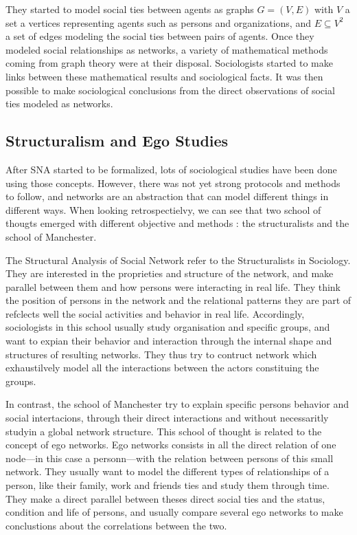 They started to model social ties between agents as graphs $G = (V, E)$ with $V$ a set a vertices representing agents such as persons and organizations, and $E \subseteq V^2$ a set of edges modeling the social ties between pairs of agents.
Once they modeled social relationships as networks, a variety of mathematical methods coming from graph theory were at their disposal. Sociologists started to make links between these mathematical results and sociological facts. It was then possible to make sociological conclusions from the direct observations of social ties modeled as networks.



\subsection{Structuralism and Ego Studies}

After SNA started to be formalized, lots of sociological studies have been done using those concepts. However, there was not yet strong protocols and methods to follow, and networks are an abstraction that can model different things in different ways. When looking retrospectielvy, we can see that two school of thougts emerged with different objective and methods : the structuralists and the school of Manchester.

The Structural Analysis of Social Network refer to the Structuralists in Sociology. They are interested in the proprieties and structure of the network, and make parallel between them and how persons were interacting in real life. They think the position of persons in the network and the relational patterns they are part of refclects well the  social activities and behavior in real life. Accordingly, sociologists in this school usually study organisation and specific groups, and want to expian their behavior and interaction through the internal shape and structures of resulting networks. They thus try to contruct network which exhaustilvely model all the interactions between the actors constituing the groups.

In contrast, the school of Manchester try to explain specific persons behavior and social intertacions, through their direct interactions and without necessaritly studyin a global network structure. This school of thought is related to the concept of ego networks. Ego networks consists in all the direct relation of one node---in this case a personn---with the relation between persons of this small network. They usually want to model the different types of relationships of a person, like their family, work and friends ties and study them through time. They make a direct parallel between theses direct social ties and the status, condition and life of persons, and usually compare several ego networks to make conclustions about the correlations between the two.

